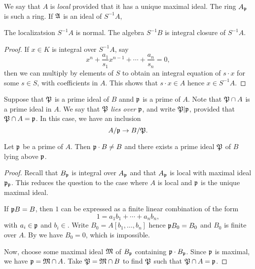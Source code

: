 We say that $A$ is \emph{local} provided that it has a unique maximal ideal.
The ring $A_{\mathfrak{p}}$ is such a ring.
If $\mathfrak{A}$ is an ideal of $S^{-1}A$, 

\begin{proposition}
  The localizatsion $S^{-1}A$ is normal.
  The algebra $S^{-1}B$ is integral closure of $S^{-1}A$.
\end{proposition}
\begin{proof}
  If $x \in K$ is integral over $S^{-1}A$, say
  \[ x^{n} + \frac{a_{1}}{s_{1}} x^{n-1} + \cdots + \frac{a_{n}}{s_{n}} = 0, \]
  then we can multiply by elements of $S$ to obtain an integral equation of $s \cdot x$ for some $s \in S$, with coefficients in $A$.
  This shows that $s \cdot x \in A$ hence $x \in S^{-1} A$.
\end{proof}

Suppose that $\mathfrak{P}$ is a prime ideal of $B$ annd $\mathfrak{p}$ is a prime of $A$.
Note that $\mathfrak{P} \cap A$ is a prime ideal in $A$.
We say that $\mathfrak{P}$ \emph{lies over} $\mathfrak{p}$, and write $\mathfrak{P} | \mathfrak{p}$, provided that $\mathfrak{P} \cap A = \mathfrak{p}$.
In this case, we have an inclusion
\[ A/\mathfrak{p} \to B/\mathfrak{P}. \]

\begin{proposition}
  Let $\mathfrak{p}$ be a prime of $A$.
  Then $\mathfrak{p} \cdot B \neq B$ and there exists a prime ideal $\mathfrak{P}$ of $B$ lying above $\mathfrak{p}$.
\end{proposition}
\begin{proof}
  Recall that $B_{\mathfrak{p}}$ is integral over $A_{\mathfrak{p}}$ and that $A_{\mathfrak{p}}$ is local with maximal ideal $\mathfrak{p}_{\mathfrak{p}}$.
  This reduces the question to the case where $A$ is local and $\mathfrak{p}$ is the unique maximal ideal.

  If $\mathfrak{p} B = B$, then $1$ can be expressed as a finite linear combination of the form
  \[ 1 = a_{1} b_{1} + \cdots + a_{n} b_{n}, \]
  with $a_{i} \in \mathfrak{p}$ and $b_{i} \in $.
  Write $B_{0} = A[b_{1},\ldots,b_{n}]$ hence $\mathfrak{p} B_{0} = B_{0}$ and $B_{0}$ is finite over $A$.
  By  we have $B_{0} = 0$, which is impossible.

  Now, choose some maximal ideal $\mathfrak{M}$ of $B_{\mathfrak{p}}$ containing $\mathfrak{p} \cdot B_{\mathfrak{p}}$.
  Since $\mathfrak{p}$ is maximal, we have $\mathfrak{p} = \mathfrak{M} \cap A$.
  Take $\mathfrak{P} = \mathfrak{M} \cap B$ to find $\mathfrak{P}$ such that $\mathfrak{P} \cap A = \mathfrak{p}$.
\end{proof}

